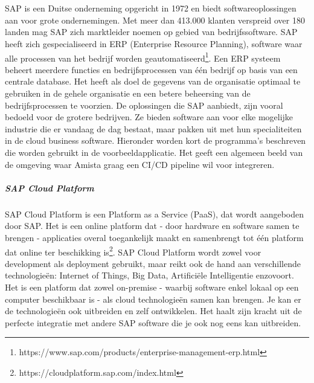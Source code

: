 \chapter{}
\label{ch:sap}
SAP is een Duitse onderneming opgericht in 1972 en biedt softwareoplossingen aan voor grote ondernemingen. Met meer dan 413.000 klanten verspreid over 180 landen mag SAP zich marktleider noemen op gebied van bedrijfssoftware.
SAP heeft zich gespecialiseerd in ERP (Enterprise Resource Planning), software waar alle processen van het bedrijf worden geautomatiseerd\footnote{https://www.sap.com/products/enterprise-management-erp.html}. Een ERP systeem beheert meerdere functies en bedrijfsprocessen van één bedrijf op basis van een centrale database. Het heeft als doel de gegevens van de organisatie optimaal te gebruiken in de gehele organisatie en een betere beheersing van de bedrijfsprocessen te voorzien.
De oplossingen die SAP aanbiedt, zijn vooral bedoeld voor de grotere bedrijven. Ze bieden software aan voor elke mogelijke industrie die er vandaag de dag bestaat, maar pakken uit met hun specialiteiten in de cloud business software.
Hieronder worden kort de programma's beschreven die worden gebruikt in de voorbeeldapplicatie. Het geeft een algemeen beeld van de omgeving waar Amista graag een CI/CD pipeline wil voor integreren.

    \paragraph{SAP Cloud Platform}
    SAP Cloud Platform is een Platform as a Service (PaaS), dat wordt aangeboden door SAP. Het is een online platform dat - door hardware en software samen te brengen - applicaties overal toegankelijk maakt en samenbrengt tot één platform dat online ter beschikking is\footnote{https://cloudplatform.sap.com/index.html}.
    SAP Cloud Platform wordt zowel voor development als deployment gebruikt, maar reikt ook de hand aan verschillende technologieën: Internet of Things, Big Data, Artificiële Intelligentie enzovoort. Het is een platform dat zowel on-premise - waarbij software enkel lokaal op een computer beschikbaar is - als cloud technologieën samen kan brengen. Je kan er de technologieën ook uitbreiden en zelf ontwikkelen. Het haalt zijn kracht uit de perfecte integratie met andere SAP software die je ook nog eens kan uitbreiden.
    
